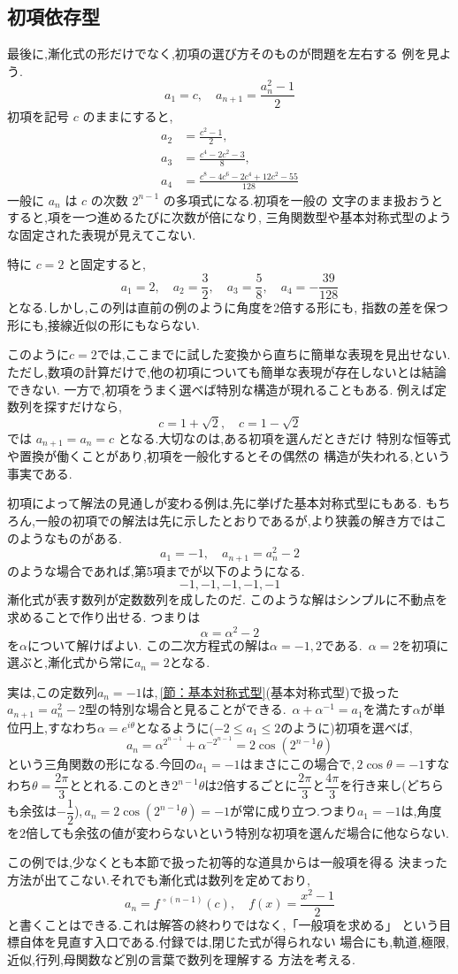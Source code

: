 \subsection{初項依存型}\label{節：初項依存型}

最後に,漸化式の形だけでなく,初項の選び方そのものが問題を左右する
例を見よう.
\[
  a_1=c,
  \quad
  a_{n+1}=\frac{a_n^2-1}{2}
\]
初項を記号 $c$ のままにすると,
\begin{align*}
  a_2&=\frac{c^2-1}{2},\\
  a_3&=\frac{c^4-2c^2-3}{8},\\
  a_4&=\frac{c^8-4c^6-2c^4+12c^2-55}{128}
\end{align*}
一般に $a_n$ は $c$ の次数 $2^{n-1}$ の多項式になる.初項を一般の
文字のまま扱おうとすると,項を一つ進めるたびに次数が倍になり,
三角関数型や基本対称式型のような固定された表現が見えてこない.

特に $c=2$ と固定すると,
\[
  a_1=2,
  \quad
  a_2=\frac{3}{2},
  \quad
  a_3=\frac{5}{8},
  \quad
  a_4=-\frac{39}{128}
\]
となる.しかし,この列は直前の例のように角度を2倍する形にも,
指数の差を保つ形にも,接線近似の形にもならない.

このように$c=2$では,ここまでに試した変換から直ちに簡単な表現を見出せない.ただし,数項の計算だけで,他の初項についても簡単な表現が存在しないとは結論できない.
一方で,初項をうまく選べば特別な構造が現れることもある.
例えば定数列を探すだけなら,
\[
  c=1+\sqrt{2},
  \quad
  c=1-\sqrt{2}
\]
では $a_{n+1}=a_n=c$ となる.大切なのは,ある初項を選んだときだけ
特別な恒等式や置換が働くことがあり,初項を一般化するとその偶然の
構造が失われる,という事実である.

初項によって解法の見通しが変わる例は,先に挙げた基本対称式型にもある.
もちろん,一般の初項での解法は先に示したとおりであるが,より狭義の解き方ではこのようなものがある.
\[
  a_1=-1,\quad a_{n+1}=a_n^2-2
\]
のような場合であれば,第5項までが以下のようになる.
\[
  -1,-1,-1,-1,-1
\]
漸化式が表す数列が定数数列を成したのだ.
このような解はシンプルに不動点を求めることで作り出せる.
つまりは
\[
  \alpha=\alpha^2-2
\]
を$\alpha$について解けばよい.
この二次方程式の解は$\alpha=-1,2$である.
\,$\alpha=2$を初項に選ぶと,漸化式から常に$a_n=2$となる.

実は,この定数列$a_n=-1$は,\,\ref{節：基本対称式型}(基本対称式型)で扱った$a_{n+1}=a_n^2-2$型の特別な場合と見ることができる.
\,$\alpha+\alpha^{-1}=a_1$を満たす$\alpha$が単位円上,すなわち$\alpha=e^{i\theta}$となるように($-2\le a_1\le2$のように)初項を選べば,
\[
  a_n=\alpha^{2^{n-1}}+\alpha^{-2^{n-1}}=2\cos(2^{n-1}\theta)
\]
という三角関数の形になる.今回の$a_1=-1$はまさにこの場合で,\,$2\cos\theta=-1$すなわち$\theta=\dfrac{2\pi}3$ととれる.このとき$2^{n-1}\theta$は$2$倍するごとに$\dfrac{2\pi}3$と$\dfrac{4\pi}3$を行き来し(どちらも余弦は$-\dfrac12$),\,$a_n=2\cos(2^{n-1}\theta)=-1$が常に成り立つ.つまり$a_1=-1$は,角度を$2$倍しても余弦の値が変わらないという特別な初項を選んだ場合に他ならない.

この例では,少なくとも本節で扱った初等的な道具からは一般項を得る
決まった方法が出てこない.それでも漸化式は数列を定めており,
\[
  a_n=f^{\,\circ(n-1)}(c),
  \quad
  f(x)=\frac{x^2-1}{2}
\]
と書くことはできる.これは解答の終わりではなく,「一般項を求める」
という目標自体を見直す入口である.付録では,閉じた式が得られない
場合にも,軌道,極限,近似,行列,母関数など別の言葉で数列を理解する
方法を考える.
